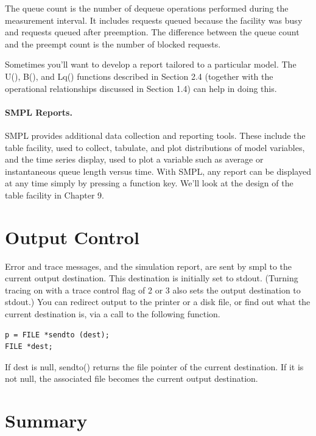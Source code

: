 The queue count is the number of dequeue operations performed during the
measurement interval. It includes requests queued because the facility was
busy and requests queued after preemption. The difference between the queue
count and the preempt count is the number of blocked requests.

Sometimes you'll want to develop a report tailored to a particular model. The
U(), B(), and Lq() functions described in Section 2.4 (together with the
operational relationships discussed in Section 1.4) can help in doing this.

\paragraph{SMPL Reports.}
SMPL provides additional data collection and reporting tools. These include
the table facility, used to collect, tabulate, and plot distributions of model
variables, and the time series display, used to plot a variable such as average
or instantaneous queue length versus time. With SMPL, any report can be
displayed at any time simply by pressing a function key. We'll look at the
design of the table facility in Chapter 9.

\section{Output Control}
\label{sec:smpl-output-control}

Error and trace messages, and the simulation report, are sent by smpl to the
current output destination. This destination is initially set to stdout.
(Turning tracing on with a trace control flag of 2 or 3 also sets the output
destination to stdout.) You can redirect output to the printer or a disk file,
or find out what the current destination is, via a call to the following
function.

\begin{verbatim}
p = FILE *sendto (dest);
FILE *dest;
\end{verbatim}

If dest is null, sendto() returns the file pointer of the current destination.
If it is not null, the associated file becomes the current output destination.

\section{Summary}
\label{sec:smpl-summary}

